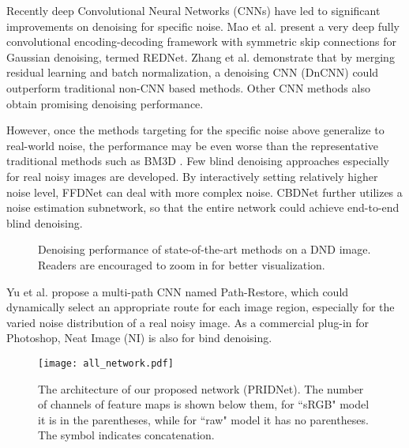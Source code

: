 \documentclass[conference]{IEEEtran}
\begin{document}
Recently deep Convolutional Neural Networks (CNNs) have led to significant improvements on denoising for specific noise. Mao et al. \cite{REDNet} present a very deep fully convolutional encoding-decoding framework with symmetric skip connections for Gaussian denoising, termed REDNet. Zhang et al. \cite{DnCNN} demonstrate that by merging residual learning and batch normalization, a denoising CNN (DnCNN) could outperform traditional non-CNN based methods. Other CNN methods \cite{N3Net,MemNet} also obtain promising denoising performance.

However, once the methods targeting for the specific noise above generalize to real-world noise, the performance may be even worse than the representative traditional methods such as BM3D \cite{BM3D}. Few blind denoising approaches especially for real noisy images are developed. By interactively setting relatively higher noise level, FFDNet \cite{FFDNet} can deal with more complex noise. CBDNet \cite{CBDNet} further utilizes a noise estimation subnetwork, so that the entire network could achieve end-to-end blind denoising.
\begin{figure}[tp]
\centering
{}\quad
{}

\centering
\caption{Denoising performance of state-of-the-art methods on a DND image. Readers are encouraged to zoom in for better visualization.}
\label{fig_DND}
\end{figure}
Yu et al. \cite{path-restore} propose a multi-path CNN named Path-Restore, which could dynamically select an appropriate route for each image region, especially for the varied noise distribution of a real noisy image.
As a commercial plug-in for Photoshop, Neat Image (NI) is also for bind denoising.

\begin{figure*}[ht]
\centering
\texttt{[image: all\_network.pdf]}
\caption{The architecture of our proposed network (PRIDNet). The number of channels of feature maps is shown below them, for ``sRGB" model it is in the parentheses, while for ``raw" model it has no parentheses. The symbol  indicates concatenation.}
\label{fig_allnet}
\end{figure*}
\end{document}
